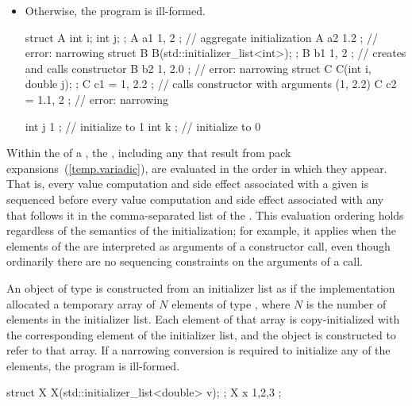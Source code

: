 \begin{itemize}
\item Otherwise, the program is ill-formed.

\enterexample
\begin{codeblock}
struct A { int i; int j; };
A a1 { 1, 2 };                      // aggregate initialization 
A a2 { 1.2 };                       // error: narrowing
struct B {
  B(std::initializer_list<int>);
};
B b1 { 1, 2 };                      // creates  and calls constructor
B b2 { 1, 2.0 };                    // error: narrowing
struct C {
  C(int i, double j);
};
C c1 = { 1, 2.2 };                  // calls constructor with arguments (1, 2.2) 
C c2 = { 1.1, 2 };                  // error: narrowing

int j { 1 };                        // initialize to 1
int k { };                          // initialize to 0
\end{codeblock}
\exitexample

\end{itemize}

\pnum
Within the  of a ,
the , including any that result from pack
expansions~(\ref{temp.variadic}), are evaluated in the order in which they
appear. That is, every value computation and side effect associated with a
given  is sequenced before every value
computation and side effect associated with any 
that follows it in the comma-separated list of the .
\enternote This evaluation ordering holds regardless of the semantics of the
initialization; for example, it applies when the elements of the
 are interpreted as arguments of a constructor
call, even though ordinarily there are no sequencing constraints on the
arguments of a call. \exitnote

\pnum
An object of type  is constructed from
an initializer list as if the implementation allocated a temporary array of $N$
elements of type , where $N$ is the number of elements in the initializer list. Each element of that array is copy-initialized with the corresponding element of the initializer list, and the  object is constructed to refer to that array. If a narrowing conversion is required to initialize any of the elements, the program is ill-formed.\enterexample
\begin{codeblock}
struct X {
  X(std::initializer_list<double> v);
};
X x{ 1,2,3 };
\end{codeblock}

